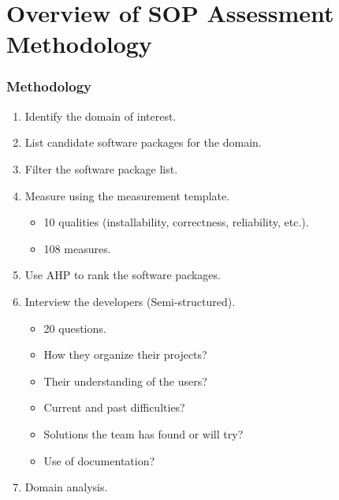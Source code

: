 \documentclass[usenames,dvipsnames]{beamer}
\begin{document}

\section[Methodology]{Overview of SOP Assessment Methodology}


\begin{frame}

  \frametitle{Methodology}

  \begin{enumerate}
    \item Identify the domain of interest.
    \item List candidate software packages for the domain.
    \item Filter the software package list.
    \item Measure using the measurement template.
    \begin{itemize}
      \item 10 qualities (installability, correctness, reliability, etc.).
      \item 108 measures.
    \end{itemize}
    \item Use AHP to rank the software packages.
    \item Interview the developers (Semi-structured).
    \begin{itemize}
      \item 20 questions.
      \item How they organize their projects?
      \item Their understanding of the users?
      \item Current and past difficulties?
      \item Solutions the team has found or will try?
      \item Use of documentation?
    \end{itemize}
    \item Domain analysis.
  \end{enumerate}
  
\end{frame}
  
\end{document}
